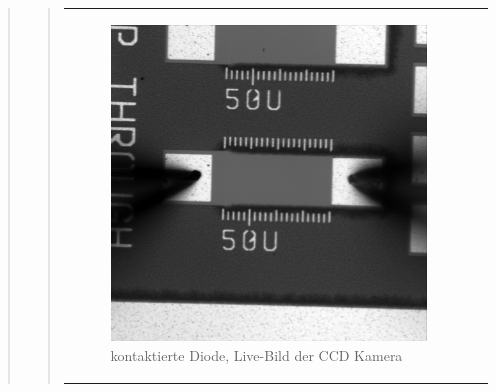 \begin{quote}
\begin{quote}
\begin{center}
\begin{tabular}{ll}
                \hspace{-10em}
                    \begin{minipage}{0.6\textwidth}

                        \begin{figure}[H]
                            \label{fig:wwwerwerew}
                            \includegraphics[scale=0.25, trim = 0cm 0cm 0cm
                            0cm,
                            clip]{./Emissionsbilder/vier/nach_Kontaktierung.jpg}
                            \caption{kontaktierte Diode, Live-Bild der CCD
                            Kamera}
                        \end{figure}

                    \end{minipage}
                    \begin{minipage}{0.6\textwidth}


\end{minipage}
\end{tabular}
\end{center}
\end{quote}
\end{quote}
